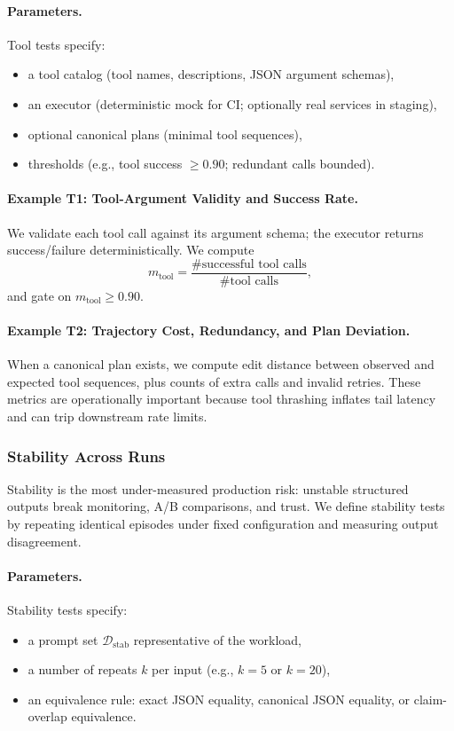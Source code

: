 \documentclass[11pt]{article}
\begin{document}
\paragraph{Parameters.}
Tool tests specify:
\begin{itemize}[leftmargin=12pt]
    \item a tool catalog (tool names, descriptions, JSON argument schemas),
    \item an executor (deterministic mock for CI; optionally real services in staging),
    \item optional canonical plans (minimal tool sequences),
    \item thresholds (e.g., tool success $\ge 0.90$; redundant calls bounded).
\end{itemize}

\paragraph{Example T1: Tool-Argument Validity and Success Rate.}
We validate each tool call against its argument schema; the executor returns success/failure deterministically.
We compute
\[
m_{\text{tool}} = \frac{\#\text{successful tool calls}}{\#\text{tool calls}},
\]
and gate on $m_{\text{tool}} \ge 0.90$.

\paragraph{Example T2: Trajectory Cost, Redundancy, and Plan Deviation.}
When a canonical plan exists, we compute edit distance between observed and expected tool sequences, plus counts of extra calls and invalid retries.
These metrics are operationally important because tool thrashing inflates tail latency and can trip downstream rate limits.

\subsubsection{Stability Across Runs}

Stability is the most under-measured production risk: unstable structured outputs break monitoring, A/B comparisons, and trust.
We define stability tests by repeating identical episodes under fixed configuration and measuring output disagreement.

\paragraph{Parameters.}
Stability tests specify:
\begin{itemize}[leftmargin=12pt]
    \item a prompt set $\mathcal{D}_{\text{stab}}$ representative of the workload,
    \item a number of repeats $k$ per input (e.g., $k=5$ or $k=20$),
    \item an equivalence rule: exact JSON equality, canonical JSON equality, or claim-overlap equivalence.
\end{itemize}
\end{document}
